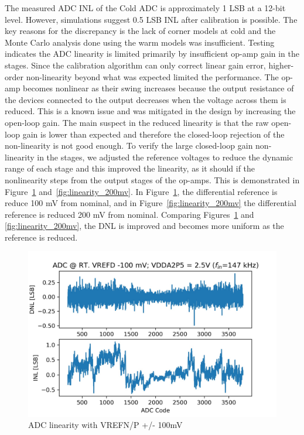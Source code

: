 \label{sec:5.3}
The measured ADC INL of the Cold ADC is approximately 1 LSB at a 12-bit level. However, simulations suggest 0.5 LSB INL after calibration is possible. The key reasons for the discrepancy is the lack of corner models at cold and the Monte Carlo analysis done using the warm models was insufficient. Testing indicates the ADC linearity is limited primarily by insufficient op-amp gain in the stages. Since the calibration algorithm can only correct linear gain error, higher-order non-linearity beyond what was expected limited the performance. The op-amp becomes nonlinear as their swing increases because the output resistance of the devices connected to the output decreases when the voltage across them is reduced. This is a known issue and was mitigated in the design by increasing the open-loop gain. The main suspect in the reduced linearity is that the raw open-loop gain is lower than expected and therefore the closed-loop rejection of the non-linearity is not good enough. To verify the large closed-loop gain non-linearity in the stages, we adjusted the reference voltages to reduce the dynamic range of each stage and this improved the linearity, as it should if the nonlinearity steps from the output stages of the op-amps. This is demonstrated in Figure~\ref{fig:linearity_100mv} and~\ref{fig:linearity_200mv}. In Figure~\ref{fig:linearity_100mv}, the differential reference is reduce 100 mV from nominal, and in Figure~\ref{fig:linearity_200mv} the differential reference is reduced 200 mV from nominal. Comparing Figures~\ref{fig:linearity_100mv} and \ref{fig:linearity_200mv}, the DNL is improved and becomes more uniform as the reference is reduced. 

\begin{figure}[h!]
\centering
  \includegraphics[width=0.7\linewidth]{figures/prakash_fig/linearity_100mv.JPG}
  \caption{ADC linearity with VREFN/P +/- 100mV}
  \label{fig:linearity_100mv}
\end{figure}

